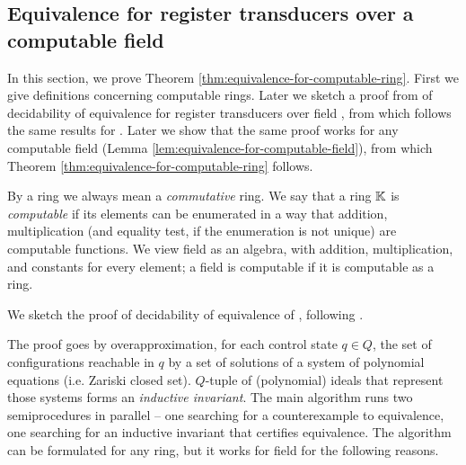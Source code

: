 \subsection{Equivalence for register transducers over a computable field}\label{sec:pol-transducers-any-ring}


In this section, we prove Theorem \ref{thm:equivalence-for-computable-ring}.%
\thmequivalenceComputableRing*
First we give definitions concerning computable rings. Later we sketch a proof from \cite[Theorem 6.6]{seidlManethKemper2018} of decidability of equivalence for register transducers over field \Q, from which follows the same results for \Z. Later we show that the same proof works for any computable field (Lemma \ref{lem:equivalence-for-computable-field}), from which Theorem \ref{thm:equivalence-for-computable-ring} follows.

By a ring we always mean a \emph{commutative} ring.
We say that a ring ${\mathbb K}$ is \emph{computable} if its elements can be enumerated in a way that addition, multiplication (and equality test, if the enumeration is not unique) are computable functions. %
We view field as an algebra, with addition, multiplication, and constants for every element; a field is computable if it is computable as a ring.


We sketch the proof of decidability of equivalence of \polTsover{\Q}, following \cite{seidlManethKemper2018}.

The proof goes by overapproximation, for each control state $q \in Q$, the set of configurations reachable in $q$ by a set of solutions of a system of polynomial equations (i.e. Zariski closed set).
$Q$-tuple of (polynomial) ideals that represent those systems forms an \emph{inductive invariant}.
The main algorithm runs two semiprocedures in parallel -- one searching for a counterexample to equivalence, one searching for an inductive invariant that certifies equivalence. The algorithm can be formulated for any ring, %
but it works for field \Q for the following reasons.

